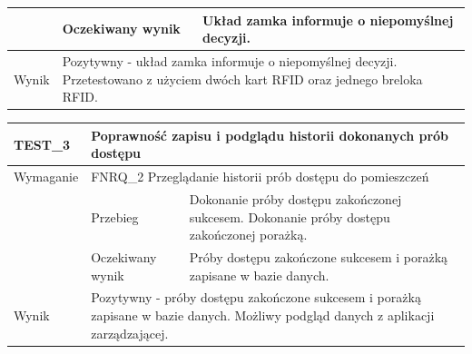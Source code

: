 \begin{table}[h!]
\begin{subtable}[c]{\textwidth}
\begin{tabular}{|p{2cm}|p{}|p{}|}
                    \cellcolor[gray]{0.8}                      & Oczekiwany wynik   & Układ zamka informuje o niepomyślnej decyzji.                                                 \\ \hline
                    \cellcolor[gray]{0.8} Wynik                 & \multicolumn{2}{p{12cm}|}{Pozytywny - układ zamka informuje o niepomyślnej decyzji. Przetestowano z użyciem dwóch kart RFID oraz jednego breloka RFID.}                                                                                  \\ \hline
                    \end{tabular}%
                \label{tbl:test2}
                \vspace{10mm}
            \end{subtable}
        \quad%
            \begin{subtable}[c]{\textwidth}
                \centering
                    \begin{tabular}{|p{2cm}|p{}|p{}|}
                    \hline
                    TEST\_3               & \multicolumn{2}{l|}{\textbf{Poprawność zapisu i podglądu historii dokonanych prób dostępu}}                                                            \\ \hline
                    \cellcolor[gray]{0.8} Wymaganie             & \multicolumn{2}{p{12cm}|}{FNRQ\_2 Przeglądanie historii prób dostępu do pomieszczeń}                                                                                    \\ \hline
                    \cellcolor[gray]{0.8} \multirow{2}{*}{Opis} & Przebieg           & Dokonanie próby dostępu zakończonej sukcesem. Dokonanie próby dostępu zakończonej porażką.                                    \\ \cline{2-3}
                    \cellcolor[gray]{0.8}                      & Oczekiwany wynik   & Próby dostępu zakończone sukcesem i porażką zapisane w bazie danych.                                                 \\ \hline
                    \cellcolor[gray]{0.8} Wynik                 & \multicolumn{2}{p{12cm}|}{Pozytywny - próby dostępu zakończone sukcesem i porażką zapisane w bazie danych. Możliwy podgląd danych z aplikacji zarządzającej.}                                                                                  \\ \hline
                    \end{tabular}%
                \label{tbl:test3}
                \vspace{10mm}
            \end{subtable}
            \label{tbl:tests}
        \end{table}

